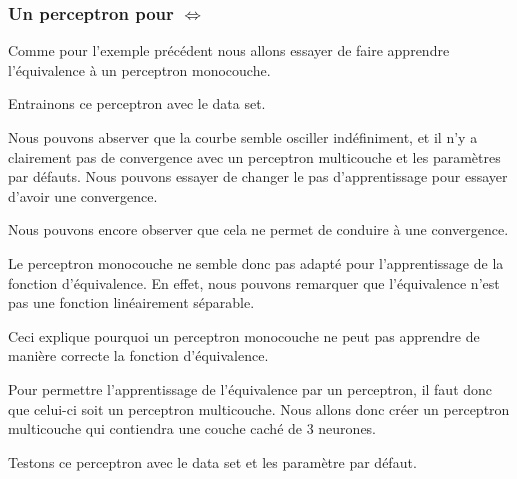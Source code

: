 \documentclass[twoside,openright,a4paper,11pt,french]{article}
\begin{document}
\subsubsection{Un perceptron pour $\Leftrightarrow$}
Comme pour l'exemple précédent nous allons essayer de faire apprendre
l'équivalence à un perceptron monocouche.


Entrainons ce perceptron avec le data set.


Nous pouvons abserver que la courbe semble osciller indéfiniment,
et il n'y a clairement pas de convergence avec un perceptron multicouche
et les paramètres par défauts.
Nous pouvons essayer de changer le pas d'apprentissage pour essayer d'avoir
une convergence.


Nous pouvons encore observer que cela ne permet de conduire à une convergence.

Le perceptron monocouche ne semble donc pas adapté pour l'apprentissage de la fonction
d'équivalence. En effet, nous pouvons remarquer que l'équivalence n'est pas une fonction
linéairement séparable.


Ceci explique pourquoi un perceptron monocouche ne peut pas apprendre de manière correcte
la fonction d'équivalence.

Pour permettre l'apprentissage de l'équivalence par un perceptron, il faut donc que
celui-ci soit un perceptron multicouche.
Nous allons donc créer un perceptron multicouche qui contiendra une couche caché de
3 neurones.

Testons ce perceptron avec le data set et les paramètre par défaut.

\end{document}
